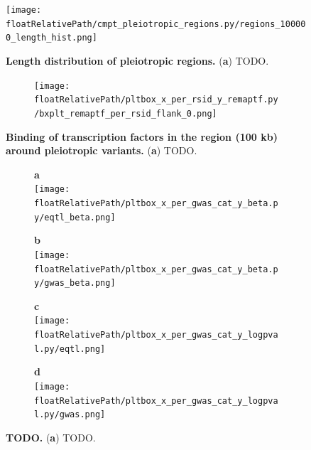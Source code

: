 \begin{figure}[]
\centering
%
\texttt{[image: \\floatRelativePath/cmpt\_pleiotropic\_regions.py/regions\_100000\_length\_hist.png]}
%
\caption{\textbf{Length distribution of pleiotropic regions.} (\textbf{a}) TODO.} \label{fig:pleiotropy_region_distribution}
\end{figure}

%
%

\begin{figure}[!]
\centering
%
\begin{subfigure}[]{.33\textwidth}
%
\texttt{[image: \\floatRelativePath/pltbox\_x\_per\_rsid\_y\_remaptf.py/bxplt\_remaptf\_per\_rsid\_flank\_0.png]}
\end{subfigure}
%
\caption{\textbf{Binding of transcription factors in the region (100 kb) around pleiotropic variants.} (\textbf{a}) TODO.} \label{fig:freq_tf_per_variant}
%
\end{figure}

%
%

\begin{figure}[!]
\centering
%
\begin{subfigure}[]{.33\textwidth}
\textbf{a}
\\
\texttt{[image: \\floatRelativePath/pltbox\_x\_per\_gwas\_cat\_y\_beta.py/eqtl\_beta.png]}
\end{subfigure}
%
\begin{subfigure}[]{.33\textwidth}
\textbf{b}
\\
\texttt{[image: \\floatRelativePath/pltbox\_x\_per\_gwas\_cat\_y\_beta.py/gwas\_beta.png]}
\end{subfigure}

\begin{subfigure}[]{.33\textwidth}
\textbf{c}
\\
\texttt{[image: \\floatRelativePath/pltbox\_x\_per\_gwas\_cat\_y\_logpval.py/eqtl.png]}
\end{subfigure}
%
\begin{subfigure}[]{.33\textwidth}
\textbf{d}
\\
\texttt{[image: \\floatRelativePath/pltbox\_x\_per\_gwas\_cat\_y\_logpval.py/gwas.png]}
\end{subfigure}

\caption{\textbf{TODO.} (\textbf{a}) TODO.} \label{fig:beta}
%
\end{figure}


